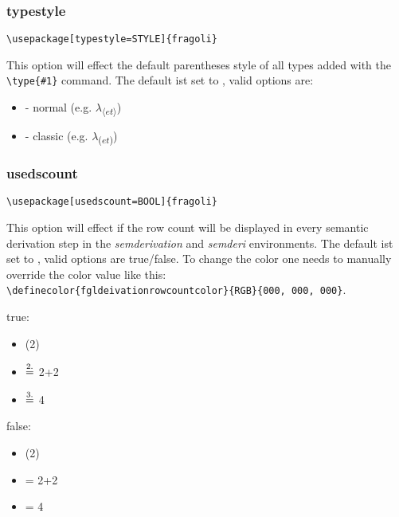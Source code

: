 \documentclass[10pt, a4paper]{article}
\newenvironment{itemizeexample}{
	\begin{itemize}
		\setlength\itemsep{-.5em}
	}
	{
	\end{itemize}
}
\begin{document}
	\subsubsection{typestyle}
	\begin{lstlisting}[style=A]
			\usepackage[typestyle=STYLE]{fragoli}
	\end{lstlisting}
	This option will effect the default parentheses style of all types added with the \verb=\type{#1}= command. The default ist set to \texttt{}, valid options are:
	\begin{itemizeexample}
		\item[-] normal (e.g. $\lambda$\textsubscript{$\langle$$et$$\rangle$})
		\item[-] classic (e.g. $\lambda$\textsubscript{($et$)})
	\end{itemizeexample}
	\subsubsection{usedscount}
	\begin{lstlisting}[style=A]
			\usepackage[usedscount=BOOL]{fragoli}
	\end{lstlisting}
	This option will effect if the row count will be displayed in every semantic derivation step in the \textit{semderivation} and \textit{semderi} environments. The default ist set to \texttt{}, valid options are true/false. To change the color one needs to manually override the color value like this: \\\verb=\definecolor{fgldeivationrowcountcolor}{RGB}{000, 000, 000}=.
	\begin{center}
		\begin{minipage}[h][2cm][t]{15em}
			true:\begin{itemizeexample}
				\item[] (2)
				\item[$\stackrel{\color{fgldeivationrowcountcolor}2.\color{black}}{=}$] 2+2
				\item[$\stackrel{\color{fgldeivationrowcountcolor}3.\color{black}}{=}$] 4
			\end{itemizeexample}
		\end{minipage}
		\begin{minipage}[h][2cm][t]{15em}
			false:\begin{itemizeexample}
				\item[] (2)
				\item[=] 2+2
				\item[=] 4
			\end{itemizeexample}
		\end{minipage}
	\end{center}
\end{document}
